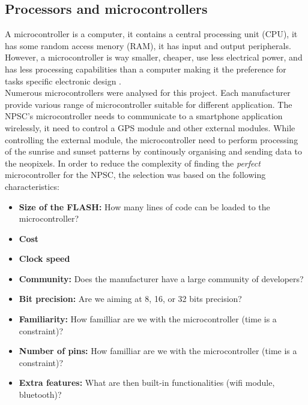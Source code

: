 \subsection{Processors and microcontrollers}
A microcontroller is a computer, it contains a central processing unit (CPU), it has some random access menory (RAM), it has input and output peripherals. However, a microcontroller is way smaller, cheaper, use less electrical power, and has less processing capabilities than a computer making it the preference for tasks specific electronic design \cite{ho2000}.\\
Numerous microcontrollers were analysed for this project. Each manufacturer provide various range of microcontroller suitable for different application.
The NPSC's microcontroller needs to communicate to a smartphone application wirelessly, it need to control a GPS module and other external modules. While controlling the external module, the microcontroller need to perform processing of the sunrise and sunset patterns by continously organising and sending data to the neopixels. In order to reduce the complexity of finding the \textit{perfect} microcontroller for the NPSC, the selection was based on the following characteristics:
\begin{itemize}
\item \textbf{Size of the FLASH:} How many lines of code can be loaded to the microcontroller?
\item \textbf{Cost}
\item \textbf{Clock speed}
\item \textbf{Community:} Does the manufacturer have a large community of developers?
\item \textbf{Bit precision:} Are we aiming at 8, 16, or 32 bits precision? 
\item \textbf{Familiarity:} How familliar are we with the microcontroller (time is a constraint)?
\item \textbf{Number of pins:} How familliar are we with the microcontroller (time is a constraint)?\
\item \textbf{Extra features:} What are then built-in functionalities (wifi module, bluetooth)?
\end{itemize}

